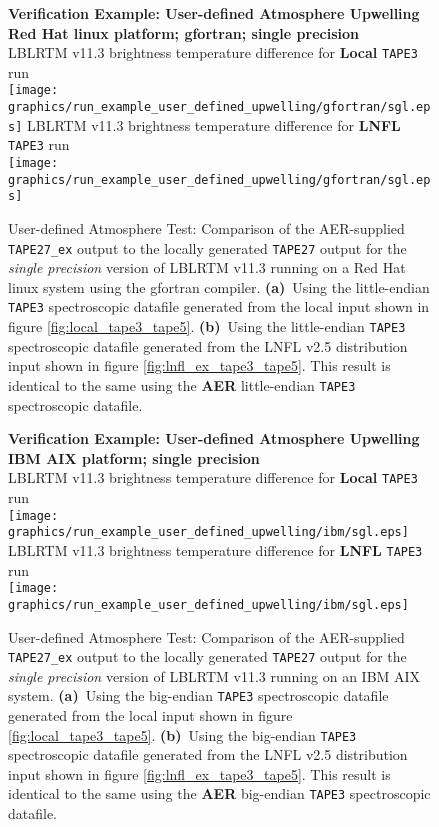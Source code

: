 \begin{figure}[htp]
  \centering
  \qquad\sffamily\textbf{Verification Example: User-defined Atmosphere Upwelling}\\
  \qquad\sffamily\textbf{Red Hat linux platform; gfortran; single precision}\\
  \qquad\textsf{LBLRTM v11.3 brightness temperature difference for \textbf{Local} \texttt{TAPE3} run}\\
  \texttt{[image: graphics/run\_example\_user\_defined\_upwelling/gfortran/sgl.eps]}
  \qquad\textsf{LBLRTM v11.3 brightness temperature difference for \textbf{LNFL} \texttt{TAPE3} run}\\
  \texttt{[image: graphics/run\_example\_user\_defined\_upwelling/gfortran/sgl.eps]}
  \caption{User-defined Atmosphere Test: Comparison of the AER-supplied \texttt{TAPE27\_ex} output to the locally generated \texttt{TAPE27} output for the \textsl{single precision} version of LBLRTM v11.3 running on a Red Hat linux system using the gfortran compiler. \mbox{\textbf{(a)} Using} the little-endian \texttt{TAPE3} spectroscopic datafile generated from the local input shown in figure \ref{fig:local_tape3_tape5}. \mbox{\textbf{(b)} Using} the little-endian \texttt{TAPE3} spectroscopic datafile generated from the LNFL v2.5 distribution input shown in figure \ref{fig:lnfl_ex_tape3_tape5}. This result is identical to the same using the \textbf{AER} little-endian \texttt{TAPE3} spectroscopic datafile.}
  \label{fig:run_example_user_defined_upwelling-sgl_gfortran}
\end{figure}

\begin{figure}[htp]
  \centering
  \qquad\sffamily\textbf{Verification Example: User-defined Atmosphere Upwelling}\\
  \qquad\sffamily\textbf{IBM AIX platform; single precision}\\
  \qquad\textsf{LBLRTM v11.3 brightness temperature difference for \textbf{Local} \texttt{TAPE3} run}\\
  \texttt{[image: graphics/run\_example\_user\_defined\_upwelling/ibm/sgl.eps]}
  \qquad\textsf{LBLRTM v11.3 brightness temperature difference for \textbf{LNFL} \texttt{TAPE3} run}\\
  \texttt{[image: graphics/run\_example\_user\_defined\_upwelling/ibm/sgl.eps]}
  \caption{User-defined Atmosphere Test: Comparison of the AER-supplied \texttt{TAPE27\_ex} output to the locally generated \texttt{TAPE27} output for the \textsl{single precision} version of LBLRTM v11.3 running on an IBM AIX system. \mbox{\textbf{(a)} Using} the big-endian \texttt{TAPE3} spectroscopic datafile generated from the local input shown in figure \ref{fig:local_tape3_tape5}. \mbox{\textbf{(b)} Using} the big-endian \texttt{TAPE3} spectroscopic datafile generated from the LNFL v2.5 distribution input shown in figure \ref{fig:lnfl_ex_tape3_tape5}. This result is identical to the same using the \textbf{AER} big-endian \texttt{TAPE3} spectroscopic datafile.}
  \label{fig:run_example_user_defined_upwelling-sgl_ibm}
\end{figure}


